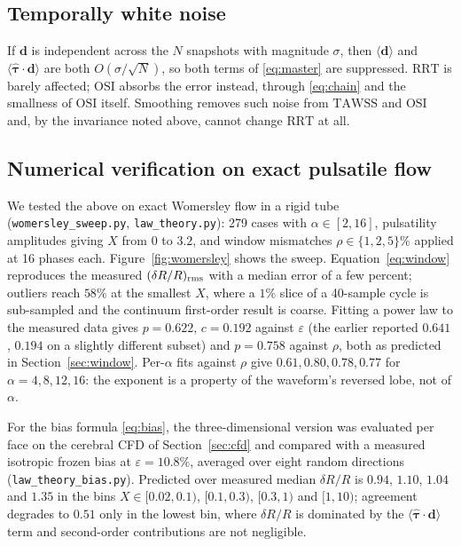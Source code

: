 \documentclass[11pt,a4paper]{article}
\newcommand{\TAWSS}{\mathrm{TAWSS}}
\newcommand{\OSI}{\mathrm{OSI}}
\newcommand{\RRT}{\mathrm{RRT}}
\newcommand{\eps}{\varepsilon}
\begin{document}
\subsection{Temporally white noise}

If $\mathbf d$ is independent across the $N$ snapshots with magnitude
$\sigma$, then $\langle\mathbf d\rangle$ and
$\langle\hat{\boldsymbol\tau}\cdot\mathbf d\rangle$ are both
$O(\sigma/\sqrt N)$, so both terms of \eqref{eq:master} are suppressed. $\RRT$
is barely affected; $\OSI$ absorbs the error instead, through
\eqref{eq:chain} and the smallness of $\OSI$ itself. Smoothing removes such
noise from $\TAWSS$ and $\OSI$ and, by the invariance noted above, cannot
change $\RRT$ at all.

\subsection{Numerical verification on exact pulsatile flow}
\label{sec:sweep}

We tested the above on exact Womersley flow in a rigid tube
(\texttt{womersley\_sweep.py}, \texttt{law\_theory.py}): 279 cases with
$\alpha\in[2,16]$, pulsatility amplitudes giving $X$ from $0$ to $3.2$, and
window mismatches $\rho\in\{1,2,5\}\%$ applied at 16 phases each.
Figure~\ref{fig:womersley} shows the sweep.
Equation~\eqref{eq:window} reproduces the measured $(\delta R/R)_{\rm rms}$
with a median error of a few percent; outliers reach $58\%$ at the smallest
$X$, where a $1\%$ slice of a 40-sample cycle is sub-sampled and the
continuum first-order result is coarse. Fitting a power law to the measured
data gives $p=0.622$, $c=0.192$ against $\eps$ (the earlier reported
$0.641$, $0.194$ on a slightly different subset) and $p=0.758$ against
$\rho$, both as predicted in Section~\ref{sec:window}. Per-$\alpha$ fits
against $\rho$ give $0.61, 0.80, 0.78, 0.77$ for $\alpha=4,8,12,16$: the
exponent is a property of the waveform's reversed lobe, not of $\alpha$.

For the bias formula \eqref{eq:bias}, the three-dimensional version was
evaluated per face on the cerebral CFD of Section~\ref{sec:cfd} and compared
with a measured isotropic frozen bias at $\eps=10.8\%$, averaged over eight
random directions (\texttt{law\_theory\_bias.py}). Predicted over measured
median $\delta R/R$ is $0.94$, $1.10$, $1.04$ and $1.35$ in the bins
$X\in[0.02,0.1)$, $[0.1,0.3)$, $[0.3,1)$ and $[1,10)$; agreement degrades to
$0.51$ only in the lowest bin, where $\delta R/R$ is dominated by the
$\langle\hat{\boldsymbol\tau}\cdot\mathbf d\rangle$ term and second-order
contributions are not negligible.
\end{document}
